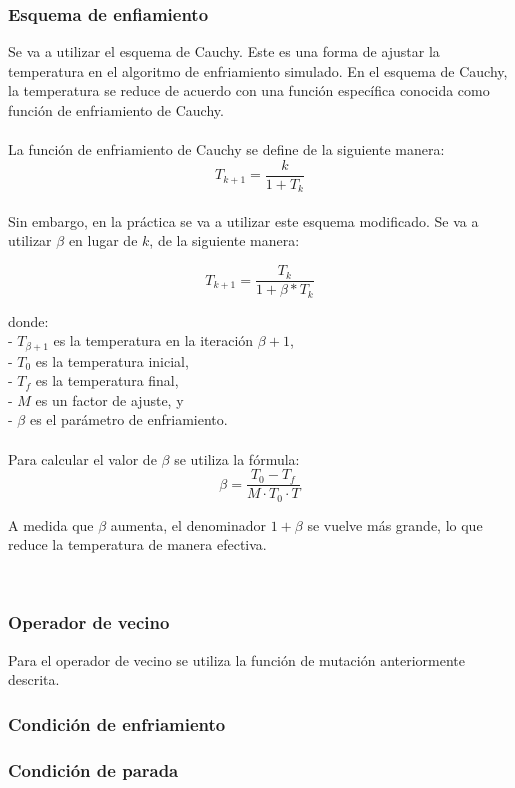 \documentclass[12pt, spanish]{article}
\begin{document}
\subsubsection{Esquema de enfiamiento}
Se va a utilizar el esquema de Cauchy. Este es una forma de ajustar la temperatura en el algoritmo de enfriamiento simulado. En el esquema de Cauchy, la temperatura se reduce de acuerdo con una función específica conocida como función de enfriamiento de Cauchy.\\
\\
La función de enfriamiento de Cauchy se define de la siguiente manera:\\

    \[ T_{k+1} = \frac{k}{1 + T_k} \]
\\
Sin embargo, en la práctica se va a utilizar este esquema modificado. Se va a utilizar \(\beta\) en lugar de \(k\), de la siguiente manera:

\[ T_{k+1} = \frac{T_k}{1 + \beta*T_{k}} \]

donde:\\
- \( T_{\beta+1} \) es la temperatura en la iteración \( \beta+1 \),\\
- \( T_0 \) es la temperatura inicial,\\
- \( T_f \) es la temperatura final,\\
- \( M \) es un factor de ajuste, y\\
- \( \beta \) es el parámetro de enfriamiento.\\
\\
Para calcular el valor de \( \beta \) se utiliza la fórmula:
\[ \beta = \frac{T_0 - T_f}{M \cdot T_0 \cdot T} \]

A medida que \( \beta \) aumenta, el denominador \( 1 + \beta \) se vuelve más grande, lo que reduce la temperatura de manera efectiva.

\\
\subsubsection{Operador de vecino}
Para el operador de vecino se utiliza la función de mutación anteriormente descrita.
\subsubsection{Condición de enfriamiento}

\subsubsection{Condición de parada}
\pagebreak
\end{document}
